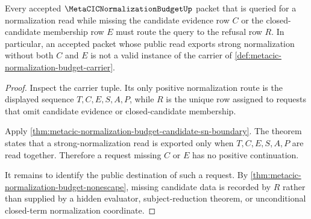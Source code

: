 \begin{theorem}
\label{thm:metacic-normalization-budget-falsifiable-boundary}
Every accepted $\MetaCICNormalizationBudgetUp$ packet that is queried for a normalization read while missing the candidate evidence row $C$ or the closed-candidate membership row $E$ must route the query to the refusal row $R$. In particular, an accepted packet whose public read exports strong normalization without both $C$ and $E$ is not a valid instance of the carrier of \autoref{def:metacic-normalization-budget-carrier}.
\end{theorem}
\begin{proof}
Inspect the carrier tuple. Its only positive normalization route is the displayed sequence $T,C,E,S,A,P$, while $R$ is the unique row assigned to requests that omit candidate evidence or closed-candidate membership.

Apply \autoref{thm:metacic-normalization-budget-candidate-sn-boundary}. The theorem states that a strong-normalization read is exported only when $T,C,E,S,A,P$ are read together. Therefore a request missing $C$ or $E$ has no positive continuation.

It remains to identify the public destination of such a request. By \autoref{thm:metacic-normalization-budget-nonescape}, missing candidate data is recorded by $R$ rather than supplied by a hidden evaluator, subject-reduction theorem, or unconditional closed-term normalization coordinate.
\end{proof}

